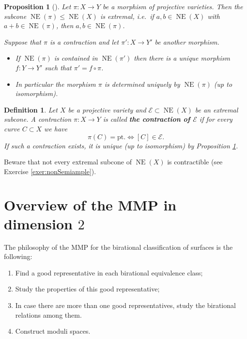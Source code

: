 \documentclass[a4paper,11pt]{amsart}
\newtheorem{proposition}[theorem]{Proposition}
\newtheorem{definition}[theorem]{Definition}
\def\NE{\operatorname{NE}}
\begin{document}
\begin{proposition}[{\cite[Proposition 1.1.4]{Debarre}}]\label{prop:rigidity}
	Let $\pi \colon X \to Y$ be a morphism of projective varieties.
	Then the subcone $\NE(\pi) \leq \NE(X)$ is extremal, i.e.\ if $a,b \in \NE(X)$ with $a+b \in \NE(\pi)$, then $a,b \in \NE(\pi)$.
	
	Suppose that $\pi$ is a contraction and let $\pi'\colon X \to Y'$ be another morphism.
	\begin{itemize}
		\item If $\NE(\pi)$ is contained in $\NE(\pi')$ then there is a \emph{unique} morphism $f\colon Y \to Y'$ such that $\pi' = f \circ \pi$.
		\item In particular the morphism $\pi$ is determined uniquely by $\NE(\pi)$ (up to isomorphism).
	\end{itemize}
\end{proposition}

\begin{definition}
	Let $X$ be a  projective variety and $\mathcal{E} \subset \NE(X)$ be an extremal subcone.
	A \emph{contraction} $\pi\colon X \to Y$ is called \textbf{the contraction of $\mathcal{E}$} if for every curve $C \subset X$ we have
	\[
	\pi(C) = \text{pt.} \iff [C] \in  \mathcal{E}.
	\]
	\emph{If} such a contraction exists, it is unique (up to isomorphism) by Proposition \ref{prop:rigidity}.
\end{definition}

Beware that not every extremal subcone of $\NE(X)$ is contractible (see Exercise \ref{exer:nonSemiample}).

\section{Overview of the MMP in dimension $2$}



The philosophy of the MMP for the birational classification of surfaces is the following:
\begin{enumerate}
	\item[{\small \fbox{MMP1}}]\label{it:MMP1} Find a good representative in each birational equivalence class;
	\item[{\small \fbox{MMP2}}]\label{it:MMP2} Study the properties of this good representative;
	\item[{\small \fbox{MMP3}}]\label{it:MMP3} In case there are more than one good representatives, study the birational relations among them.
	\item[{\small \fbox{MMP4}}]\label{it:MMP4} Construct moduli spaces.
\end{enumerate}
\end{document}
